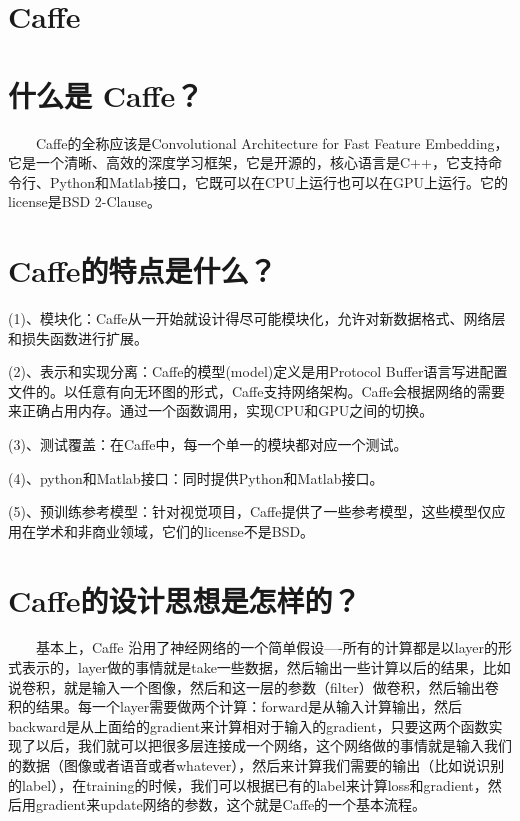 \section{ Caffe}\label{caffe}

\section{ 什么是 Caffe？}\label{ux4ec0ux4e48ux662f-caffe}

  Caffe的全称应该是Convolutional Architecture for Fast Feature
Embedding，它是一个清晰、高效的深度学习框架，它是开源的，核心语言是C++，它支持命令行、Python和Matlab接口，它既可以在CPU上运行也可以在GPU上运行。它的license是BSD
2-Clause。

\section{Caffe的特点是什么？}\label{caffeux7684ux7279ux70b9ux662fux4ec0ux4e48}

(1)、模块化：Caffe从一开始就设计得尽可能模块化，允许对新数据格式、网络层和损失函数进行扩展。

(2)、表示和实现分离：Caffe的模型(model)定义是用Protocol
Buffer语言写进配置文件的。以任意有向无环图的形式，Caffe支持网络架构。Caffe会根据网络的需要来正确占用内存。通过一个函数调用，实现CPU和GPU之间的切换。

(3)、测试覆盖：在Caffe中，每一个单一的模块都对应一个测试。

(4)、python和Matlab接口：同时提供Python和Matlab接口。

(5)、预训练参考模型：针对视觉项目，Caffe提供了一些参考模型，这些模型仅应用在学术和非商业领域，它们的license不是BSD。

\section{Caffe的设计思想是怎样的？}\label{caffeux7684ux8bbeux8ba1ux601dux60f3ux662fux600eux6837ux7684}

  基本上，Caffe
沿用了神经网络的一个简单假设----所有的计算都是以layer的形式表示的，layer做的事情就是take一些数据，然后输出一些计算以后的结果，比如说卷积，就是输入一个图像，然后和这一层的参数（filter）做卷积，然后输出卷积的结果。每一个layer需要做两个计算：forward是从输入计算输出，然后backward是从上面给的gradient来计算相对于输入的gradient，只要这两个函数实现了以后，我们就可以把很多层连接成一个网络，这个网络做的事情就是输入我们的数据（图像或者语音或者whatever），然后来计算我们需要的输出（比如说识别的label），在training的时候，我们可以根据已有的label来计算loss和gradient，然后用gradient来update网络的参数，这个就是Caffe的一个基本流程。

